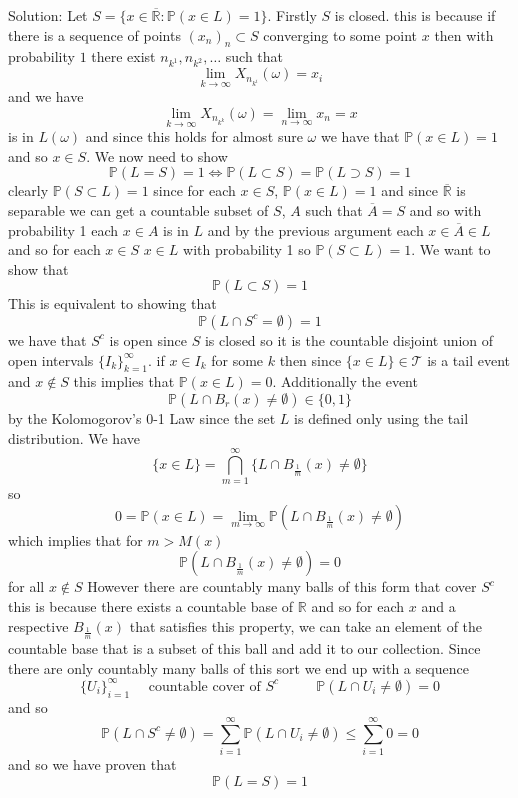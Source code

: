 \documentclass[11pt]{article}
\newcommand{\solution}[1]{{{\textcolor{header}{Solution:} \textcolor{solution}{#1}}}}
\begin{document}
\solution{
    Let $S = \{x \in \overline{ \mathbb{R}} : \mathbb{P}(x \in L) = 1\}$. Firstly $S$ is closed. this is because if
    there is a sequence of points $(x_n)_n \subset S$ converging to some point  $x$ then  with probability $1$
    there exist  $n_{k^{1}}, n_{k^{2}}, \dots$ such that
    \[
        \lim_{k\to \infty} X_{n_{k^{i}}}(\omega) = x_i
    \] 
    and we have
    \[
        \lim_{k\to \infty}X_{n_{k^{k}}}(\omega) = \lim_{n\to \infty}x_n = x
    \] 
    is in $L(\omega)$ and since this holds for almost sure  $\omega$ we have that  $ \mathbb{P}(x \in L) = 1$ and so $x \in S$. We now need to show
    \[
    \mathbb{P}(L = S) = 1 \iff \mathbb{P}(L \subset S) = \mathbb{P}(L \supset S) = 1
    \] 
    clearly $ \mathbb{P}(S \subset L) = 1$ since for each $x \in S$,  $ \mathbb{P}(x \in L) = 1 $ and since $ \overline{\mathbb{R}}$ is separable we can
    get a countable subset of $S$, $A$ such that $\overline{ A} = S$ and so with probability 1 each $x \in A$ is in  $L$ and by the previous argument each  $x \in \overline{ A} \in L$ and so for each $x \in S$  $x \in L$ with
    probability 1 so  $ \mathbb{P}(S \subset L) = 1$. We want to show that
     \[
    \mathbb{P}(L \subset S) = 1
    \] 
     This is equivalent to showing that
     \[
     \mathbb{P}(L \cap S^{c} = \emptyset) = 1
     \] 
     we have that $S^{c}$ is open since $ S$ is closed so it is the countable disjoint union of open intervals $\{I_k\}_{k=1}^{\infty}$. 
     if $x \in I_k$ for some  $k$ then since $\{x \in L\} \in \mathcal{T}$ is a tail event and $x \not\in S$ this implies that  $ \mathbb{P}(x \in L) = 0$.
     Additionally the event
     \[
         \mathbb{P}(L \cap B_r(x) \ne \emptyset) \in \{0,1\}
     \] 
     by the Kolomogorov's 0-1 Law since the set $L$ is defined only using the tail distribution. We have
     \[
         \{x \in L\} = \bigcap_{m=1}^{\infty} \{L \cap B_{\frac{1}{m}}(x) \ne \emptyset\}
     \] 
     so
     \[
     0 = \mathbb{P}(x \in L) = \lim_{m\to \infty} \mathbb{P}( L \cap B_{\frac{1}{m}}(x) \ne \emptyset)
     \] 
     which implies that for $m > M(x)$ 
      \[
          \mathbb{P}(L \cap B_{\frac{1}{m}}(x) \ne \emptyset) = 0
     \] 
     for all $x \not\in S$ However there are countably many balls of this form that cover $S^{c}$ this is because there exists a countable base of $ \mathbb{R}$ and so for each $x$ and a respective $B_{\frac{1}{m}}(x)$ that satisfies this property,
     we can take an element of the countable base that is a subset of this ball and add it to our collection. Since there are only countably many balls of this sort we end up with a sequence
     \[
         \{U_i\}_{i=1}^{\infty} \quad \text{ countable cover of $S^{c}$ } \qquad \mathbb{P}(L \cap U_i \ne \emptyset) = 0
     \] 
     and so
     \[
     \mathbb{P}(L \cap S^{c} \ne \emptyset) = \sum_{i=1}^{\infty} \mathbb{P}(L \cap U_i \ne \emptyset) \le \sum_{i=1}^{\infty}0 =0
     \] 
     and so we have proven that
     \[
     \mathbb{P}(L = S) = 1
     \] 
}
\end{document}
